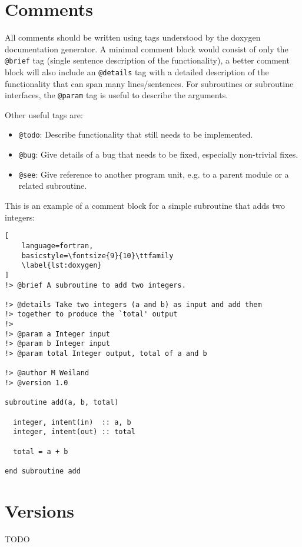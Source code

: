 \documentclass[11pt]{article}
\begin{document}
\section{Comments}
All comments should be written using tags understood by the doxygen documentation generator. A minimal comment
block would consist of only the \texttt{@brief} tag (single sentence description of the functionality), a better comment
block will also include an \texttt{@details} tag with a detailed description of the functionality that can span many 
lines/sentences. For subroutines or subroutine interfaces, the \texttt{@param} tag is useful to describe the arguments.

Other useful tags are:
\begin{itemize}
  \item \texttt{@todo}: Describe functionality that still needs to be implemented.
  \item \texttt{@bug}: Give details of a bug that needs to be fixed, especially non-trivial fixes.
  \item \texttt{@see}: Give reference to another program unit, e.g. to a parent module or a related subroutine.
\end{itemize}


This is an example of a comment block for a simple subroutine that adds two integers:

\begin{lstlisting}[
	language=fortran,
    basicstyle=\fontsize{9}{10}\ttfamily
    \label{lst:doxygen}
]
!> @brief A subroutine to add two integers.

!> @details Take two integers (a and b) as input and add them
!> together to produce the `total' output
!> 
!> @param a Integer input
!> @param b Integer input
!> @param total Integer output, total of a and b

!> @author M Weiland
!> @version 1.0 

subroutine add(a, b, total)

  integer, intent(in)  :: a, b
  integer, intent(out) :: total

  total = a + b

end subroutine add
\end{lstlisting}

\section{Versions}
TODO
\end{document}
